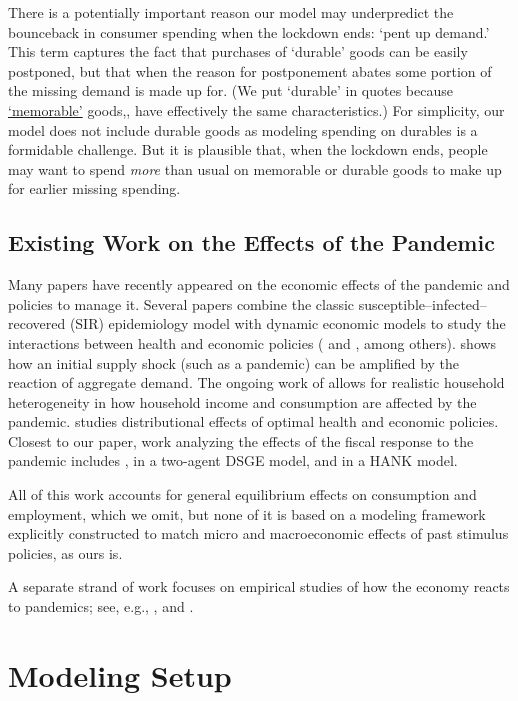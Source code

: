\documentclass[titlepage,a4paper]{\econtex}
\begin{document}
There is a potentially important reason our model may underpredict the bounceback in consumer spending when the lockdown ends: `pent up demand.'  This term captures the fact that purchases of `durable' goods can be easily postponed, but that when the reason for postponement abates some portion of the missing demand is made up for.  (We put `durable' in quotes because \href{https://www.nber.org/papers/w19386}{`memorable'} goods,\cite{hkpMemory}, have effectively the same characteristics.) For simplicity, our model does not include durable goods as modeling spending on durables is a formidable challenge.  But it is plausible that, when the lockdown ends, people may want to spend \textit{more} than usual on memorable or durable goods to make up for earlier missing spending.

\subsection*{Existing Work on the Effects of the Pandemic}

Many papers have recently appeared on the economic effects of the pandemic and policies to manage it.
Several papers combine the classic susceptible--infected--recovered (SIR) epidemiology model with dynamic economic models to study the interactions between health and economic policies (\cite{ert_covid} and \cite{aal_covid}, among others).
\cite{covidMacroImpl} shows how an initial supply shock (such as a pandemic) can be amplified by the reaction of aggregate demand.
The ongoing work of \cite{kmv_pandemics} allows for realistic household heterogeneity in how household income and consumption are affected by the pandemic.
\cite{healthWealth} studies distributional effects of optimal health and economic policies.
Closest to our paper, work analyzing the effects of the fiscal response to the pandemic includes \cite{faria_FPpandemic}, in a two-agent DSGE model, and \cite{bayer_corona} in a HANK model.

All of this work accounts for general equilibrium effects on consumption and employment, which we omit, but none of it is based on a modeling framework explicitly constructed to match micro and macroeconomic effects of past stimulus policies, as ours is.

A separate strand of work focuses on empirical studies of how the economy reacts to pandemics; see, e.g., \cite{baker_Cpandemic}, \cite{jorda_pandemics} and \cite{verner_pandemics}.

\section{Modeling Setup}
\end{document}
